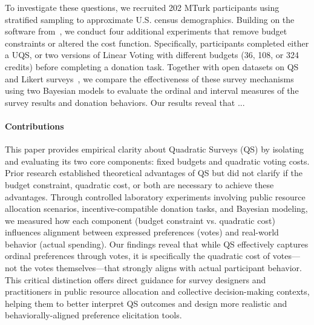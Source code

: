 
To investigate these questions, we recruited 202 MTurk participants using stratified sampling to approximate U.S. census demographics. Building on the software from~\citet{chengCanShowWhat2021}, we conduct four additional experiments that remove budget constraints or altered the cost function. Specifically, participants completed either a UQS, or two versions of Linear Voting with different budgets (36, 108, or 324 credits) before completing a donation task. Together with open datasets on QS and Likert surveys~\cite{illinoisdatabankIDB-1928463}, we compare the effectiveness of these survey mechanisms using two Bayesian models to evaluate the ordinal and interval measures of the survey results and donation behaviors. Our results reveal that ...


\paragraph{Contributions} This paper provides empirical clarity about Quadratic Surveys (QS) by isolating and evaluating its two core components: fixed budgets and quadratic voting costs. Prior research established theoretical advantages of QS but did not clarify if the budget constraint, quadratic cost, or both are necessary to achieve these advantages. Through controlled laboratory experiments involving public resource allocation scenarios, incentive-compatible donation tasks, and Bayesian modeling, we measured how each component (budget constraint vs. quadratic cost) influences alignment between expressed preferences (votes) and real-world behavior (actual spending). Our findings reveal that while QS effectively captures ordinal preferences through votes, it is specifically the quadratic cost of votes—not the votes themselves—that strongly aligns with actual participant behavior. This critical distinction offers direct guidance for survey designers and practitioners in public resource allocation and collective decision-making contexts, helping them to better interpret QS outcomes and design more realistic and behaviorally-aligned preference elicitation tools.


